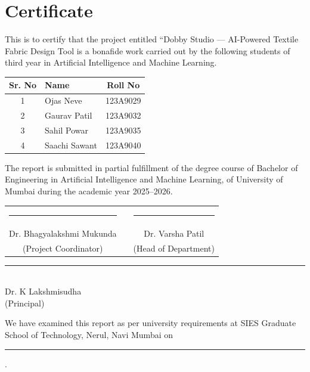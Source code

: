 \chapter*{Certificate}
\vspace{1cm}

This is to certify that the project entitled ``Dobby Studio — AI-Powered Textile Fabric Design Tool is a bonafide work carried out by the following students of third year in Artificial Intelligence and Machine Learning.

\vspace{1cm}
\begin{center}
\begin{tabular}{|c|l|c|}
    \hline
    \textbf{Sr. No} & \textbf{Name} & \textbf{Roll No} \\ \hline
    1 & Ojas Neve & 123A9029 \\ \hline
    2 & Gaurav Patil & 123A9032 \\ \hline
    3 & Sahil Powar & 123A9035 \\ \hline
    4 & Saachi Sawant & 123A9040 \\ \hline
\end{tabular}
\end{center}
\vspace{1cm}

The report is submitted in partial fulfillment of the degree course of Bachelor of Engineering in Artificial Intelligence and Machine Learning, of University of Mumbai during the academic year 2025–2026.

\vspace{3cm}

\noindent
\begin{tabular}{ccc}
    \rule{5cm}{1pt} & \hspace{1cm} & \rule{5cm}{1pt} \\
    Dr. Bhagyalakshmi Mukunda & & Dr. Varsha Patil \\
    (Project Coordinator) & & (Head of Department)
\end{tabular}

\vspace{3cm}

\begin{center}
    \rule{5cm}{1pt} \\
    Dr. K Lakshmisudha \\
    (Principal)
\end{center}

\vspace{1cm}

\noindent We have examined this report as per university requirements at SIES Graduate School of Technology, Nerul, Navi Mumbai on \rule{4cm}{0.5pt}.
